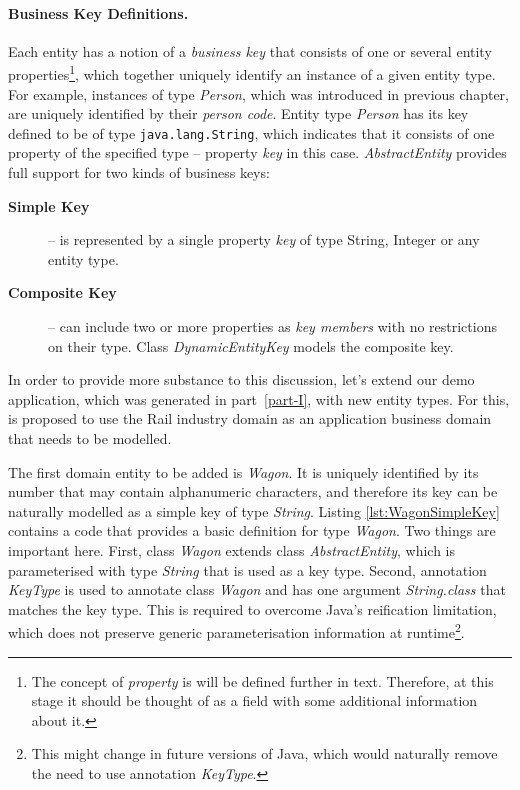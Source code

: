   \paragraph*{Business Key Definitions.}
  Each entity has a notion of a \emph{business key} that consists of one or several entity properties\footnote{The concept of \emph{property} is will be defined further in text. Therefore, at this stage it should be thought of as a field with some additional information about it.}, which together uniquely identify an instance of a given entity type.
  For example, instances of type \emph{Person}, which was introduced in previous chapter, are uniquely identified by their \emph{person code}.
  Entity type \emph{Person} has its key defined to be of type \texttt{java.lang.String}, which indicates that it consists of one property of the specified type -- property \emph{key} in this case.
  \emph{AbstractEntity} provides full support for two kinds of business keys:
  \begin{description}
    \item[\textbf{Simple Key}] -- is represented by a single property \emph{key} of type String, Integer or any entity type.
    \item[\textbf{Composite Key}] -- can include two or more properties as \emph{key members} with no restrictions on their type. Class \emph{DynamicEntityKey} models the composite key.
   \end{description}

  In order to provide more substance to this discussion, let's extend our demo application, which was generated in part~\ref{part-I}, with new entity types.
  For this, is proposed to use the Rail industry domain as an application business domain that needs to be modelled.
  
  The first domain entity to be added is \emph{Wagon}.
  It is uniquely identified by its number that may contain alphanumeric characters, and therefore its key can be naturally modelled as a simple key of type \emph{String}.
  Listing \ref{lst:WagonSimpleKey} contains a code that provides a basic definition for type \emph{Wagon}.
  Two things are important here.
  First, class \emph{Wagon} extends class \emph{AbstractEntity}, which is parameterised with type \emph{String} that is used as a key type.
  Second, annotation \emph{KeyType} is used to annotate class \emph{Wagon} and has one argument \emph{String.class} that matches the key type.
  This is required to overcome Java's reification limitation, which does not preserve generic parameterisation information at runtime\footnote{This might change in future versions of Java, which would naturally remove the need to use annotation \emph{KeyType}.}.

